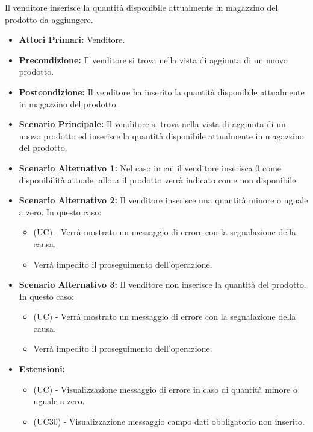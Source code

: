 Il venditore inserisce la quantità disponibile attualmente in magazzino del prodotto da aggiungere.
\begin{itemize}
    \item \textbf{Attori Primari:} Venditore.
    \item \textbf{Precondizione:} Il venditore si trova nella vista di aggiunta di un nuovo prodotto.
    \item \textbf{Postcondizione:} Il venditore ha inserito la quantità disponibile attualmente in magazzino del prodotto.
    \item \textbf{Scenario Principale:} Il venditore si trova nella vista di aggiunta di un nuovo prodotto ed inserisce la quantità disponibile attualmente in magazzino del prodotto.
    \item \textbf{Scenario Alternativo 1:} Nel caso in cui il venditore inserisca 0 come disponibilità attuale, allora il prodotto verrà indicato come non disponibile.
    \item \textbf{Scenario Alternativo 2:} Il venditore inserisce una quantità minore o uguale a zero. In questo caso:
    \begin{itemize}
        \item (UC) - Verrà mostrato un messaggio di errore con la segnalazione della causa.
        \item Verrà impedito il proseguimento dell'operazione.
    \end{itemize}
    \item \textbf{Scenario Alternativo 3:} Il venditore non inserisce la quantità del prodotto. In questo caso:
    \begin{itemize}
        \item (UC) - Verrà mostrato un messaggio di errore con la segnalazione della causa.
        \item Verrà impedito il proseguimento dell'operazione.
    \end{itemize}
    \item \textbf{Estensioni:}
        \begin{itemize}
            \item (UC) - Visualizzazione messaggio di errore in caso di quantità minore o uguale a zero.
            \item (UC30) - Visualizzazione messaggio campo dati obbligatorio non inserito.
        \end{itemize}
\end{itemize}

